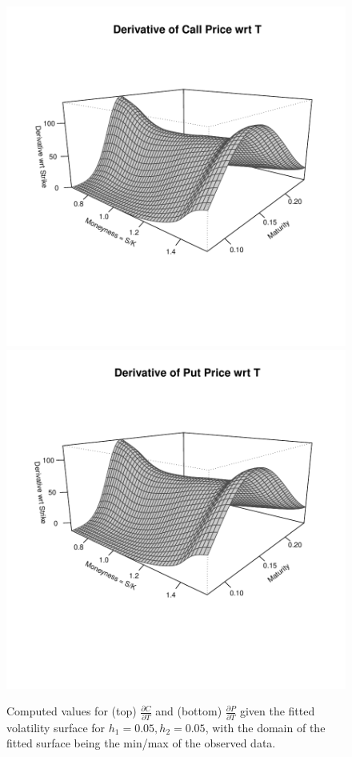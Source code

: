 \documentclass[11pt]{article}
\begin{document}
\begin{figure}[H]
	\centering
 	\includegraphics[scale=0.65]{../plots/q3/call_T.pdf}
 	\includegraphics[scale=0.65]{../plots/q3/put_T.pdf}
\caption{Computed values for (top) $\frac{\partial C}{\partial T}$ and (bottom) $\frac{\partial P}{\partial T}$ given the fitted volatility surface for $h_1 = 0.05, h_2 = 0.05$, with the domain of the fitted surface being the min/max of the observed data.}
\label{fig:T}
\end{figure}
\end{document}
